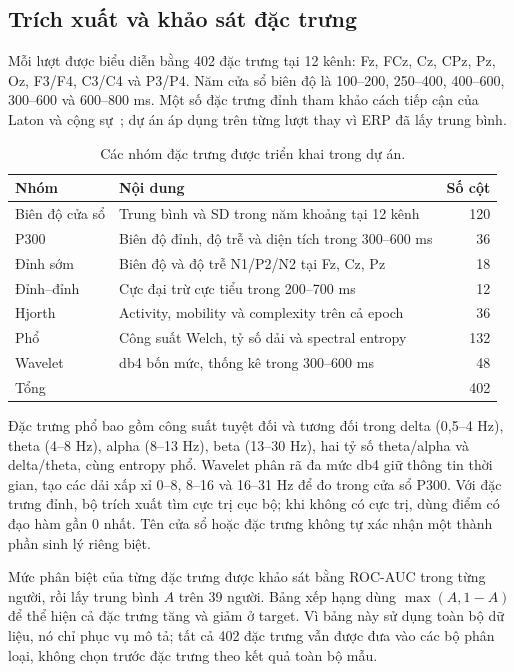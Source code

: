 \documentclass[11pt,a4paper]{article}
\begin{document}
\subsection{Trích xuất và khảo sát đặc trưng}
Mỗi lượt được biểu diễn bằng 402 đặc trưng tại 12 kênh: Fz, FCz, Cz, CPz, Pz, Oz, F3/F4, C3/C4 và P3/P4. Năm cửa sổ biên độ là 100--200, 250--400, 400--600, 300--600 và 600--800 ms. Một số đặc trưng đỉnh tham khảo cách tiếp cận của Laton và cộng sự~\cite{laton}; dự án áp dụng trên từng lượt thay vì ERP đã lấy trung bình.

\begin{table}[htbp]
\centering\small
\caption{Các nhóm đặc trưng được triển khai trong dự án.}
\label{tab:features}
\begin{tabularx}{\linewidth}{lYr}
\toprule
Nhóm & Nội dung & Số cột\\\midrule
Biên độ cửa sổ & Trung bình và SD trong năm khoảng tại 12 kênh & 120\\
P300 & Biên độ đỉnh, độ trễ và diện tích trong 300--600 ms & 36\\
Đỉnh sớm & Biên độ và độ trễ N1/P2/N2 tại Fz, Cz, Pz & 18\\
Đỉnh--đỉnh & Cực đại trừ cực tiểu trong 200--700 ms & 12\\
Hjorth & Activity, mobility và complexity trên cả epoch & 36\\
Phổ & Công suất Welch, tỷ số dải và spectral entropy & 132\\
Wavelet & db4 bốn mức, thống kê trong 300--600 ms & 48\\\midrule
Tổng & & 402\\\bottomrule
\end{tabularx}
\end{table}

Đặc trưng phổ bao gồm công suất tuyệt đối và tương đối trong delta (0,5--4 Hz), theta (4--8 Hz), alpha (8--13 Hz), beta (13--30 Hz), hai tỷ số theta/alpha và delta/theta, cùng entropy phổ. Wavelet phân rã đa mức db4 giữ thông tin thời gian, tạo các dải xấp xỉ 0--8, 8--16 và 16--31 Hz để đo trong cửa sổ P300. Với đặc trưng đỉnh, bộ trích xuất tìm cực trị cục bộ; khi không có cực trị, dùng điểm có đạo hàm gần 0 nhất. Tên cửa sổ hoặc đặc trưng không tự xác nhận một thành phần sinh lý riêng biệt.

Mức phân biệt của từng đặc trưng được khảo sát bằng ROC-AUC trong từng người, rồi lấy trung bình $A$ trên 39 người. Bảng xếp hạng dùng $\max(A,1-A)$ để thể hiện cả đặc trưng tăng và giảm ở target. Vì bảng này sử dụng toàn bộ dữ liệu, nó chỉ phục vụ mô tả; tất cả 402 đặc trưng vẫn được đưa vào các bộ phân loại, không chọn trước đặc trưng theo kết quả toàn bộ mẫu.
\end{document}
